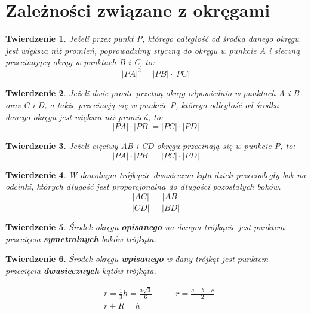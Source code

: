 \documentclass{article}
\numberwithin{equation}{section}
\newtheorem{theorem}{Twierdzenie}[section]
\begin{document}
  \section{Zależności związane z okręgami}
    \begin{theorem}
      Jeżeli przez punkt P, którego odległość od środka danego okręgu jest większa niż promień, poprowadzimy styczną do okręgu w punkcie A i sieczną przecinającą okrąg w punktach B i C, to:
      \begin{equation}
        |PA|^2 = |PB| \cdot |PC|
      \end{equation}
    \end{theorem}
    \begin{theorem}
      Jeżeli dwie proste przetną okrąg odpowiednio w punktach A i B oraz C i D, a także przecinają się w punkcie P, którego odległość od środka danego okręgu jest większa niż promień, to:
      \begin{equation}
        |PA| \cdot |PB| = |PC| \cdot |PD|
      \end{equation}
    \end{theorem}
    \begin{theorem}
      Jeżeli cięciwy AB i CD okręgu przecinają się w punkcie P, to:
      \begin{equation}
        |PA| \cdot |PB| = |PC| \cdot |PD|
      \end{equation}
    \end{theorem}
    \begin{theorem}
      W dowolnym trójkącie dwusieczna kąta dzieli przeciwległy bok na odcinki, których długość jest proporcjonalna do długości pozostałych boków.
      \begin{equation}
        \frac{|AC|}{|CD|} = \frac{|AB|}{|BD|}
      \end{equation}
    \end{theorem}
    \begin{theorem}
      Środek okręgu \textbf{opisanego} na danym trójkącie jest punktem przecięcia \textbf{symetralnych} boków trójkąta.
    \end{theorem}
    \begin{theorem}
      Środek okręgu \textbf{wpisanego} w dany trójkąt jest punktem przecięcia \textbf{dwusiecznych} kątów trójkąta.
    \end{theorem}
    \begin{equation}
      \begin{aligned}
        &r = \frac 13h = \frac{a\sqrt3}{6}\qquad&r = \frac{a+b-c}{2}\\
        &r + R = h
      \end{aligned}
    \end{equation}
\end{document}
